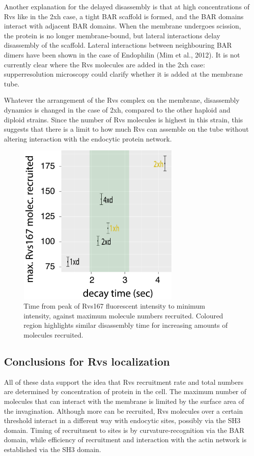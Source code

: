 	\vspace{5mm}
Another explanation for the delayed disassembly is that at high concentrations of Rvs like in the 2xh case, a tight BAR scaffold is formed, and the BAR domains interact with adjacent BAR domains. When the membrane undergoes scission, the protein is no longer membrane-bound, but lateral interactions delay disassembly of the scaffold. Lateral interactions between neighbouring BAR dimers have been shown in the case of Endophilin (Mim et al., 2012). It is not currently clear where the Rvs molecules are added in the 2xh case: supperresolution microscopy could clarify whether it is added at the membrane tube.

\vspace{5mm}
Whatever the arrangement of the Rvs complex on the membrane, disassembly dynamics is changed in the case of 2xh, compared to the other haploid and diploid strains. Since the number of Rvs molecules is highest in this strain, this suggests that there is a limit to how much Rvs can assemble on the tube without altering interaction with the endocytic protein network. 

\begin{figure}[H]
	\centering
	\includegraphics[width=8cm,height=8cm,keepaspectratio]{figures/discussion/decay_final}
	\caption[Rvs decay time]
	{Time from peak of Rvs167 fluorescent intensity to minimum intensity, against maximum molecule numbers recruited. Coloured region highlights similar disassembly time for increasing amounts of molecules recruited.    
		\label{decay_final}}
\end{figure}

\subsection{Conclusions for Rvs localization }
All of these data support the idea that Rvs recruitment rate and total numbers are determined by concentration of protein in the cell. The maximum number of molecules that can interact with the membrane is limited by the surface area of the invagination. Although more can be recruited, Rvs molecules over a certain threshold interact in a different way with endocytic sites, possibly via the SH3 domain. Timing of recruitment to sites is by curvature-recognition via the BAR domain, while efficiency of recruitment and interaction with the actin network is established via the SH3 domain. 



